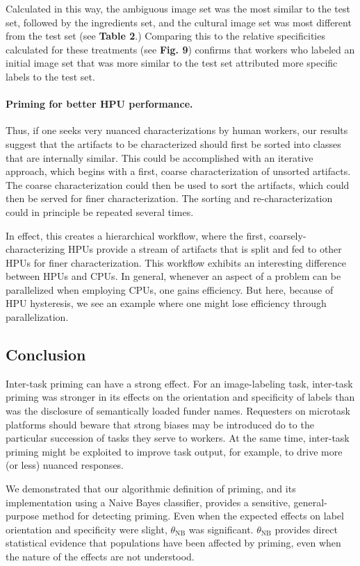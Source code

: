 \documentclass[a4paper]{report}
\begin{document}
Calculated in this way, the ambiguous image set was the most similar to the 
test set, followed by the ingredients set, and the cultural image set
was most different from the test set (see \textbf{Table 2}.)  Comparing
this to the relative specificities calculated for these treatments 
(see \textbf{Fig. 9}) confirms that workers who labeled an initial 
image set that was more similar to the test set attributed more specific 
labels to the test set.

\paragraph{Priming for better HPU performance.}
Thus, if one seeks very nuanced characterizations by human workers, 
our results suggest that the artifacts to be characterized should first 
be sorted into classes that are internally similar. This could be accomplished 
with an iterative approach, which begins with a first, coarse 
characterization of unsorted artifacts. The coarse characterization could then 
be used to sort the artifacts, which could then be served for finer 
characterization.  The sorting and re-characterization could in principle be
repeated several times.

In effect, this creates a hierarchical workflow, where the first, 
coarsely-characterizing HPUs provide a stream of artifacts that is split and 
fed to other HPUs for finer characterization.  This workflow exhibits an 
interesting difference between HPUs and CPUs.  In general,
whenever an aspect of a problem can be parallelized when employing CPUs, one
gains efficiency.  But here, because of HPU hysteresis, we see an example where
one might lose efficiency through parallelization.

\subsection*{Conclusion}
Inter-task priming can have a strong effect.  
For an image-labeling task, inter-task priming was stronger in its effects on 
the orientation and specificity of labels than was the disclosure of 
semantically loaded funder names.  Requesters on microtask platforms should 
beware that strong biases may be introduced do to the particular succession
of tasks they serve to workers.
At the 
same time, inter-task priming might be exploited to improve task output, for 
example, to drive more (or less) nuanced responses.

We demonstrated that our algorithmic definition of priming, and its 
implementation using a Naive Bayes classifier, provides a sensitive,
general-purpose method for detecting priming.  Even when the expected effects 
on label orientation and specificity were slight, $\theta_\text{NB}$ 
was significant.  $\theta_\text{NB}$ provides direct statistical evidence that 
populations have been affected by priming, even when the nature of the 
effects are not understood. 
\end{document}
